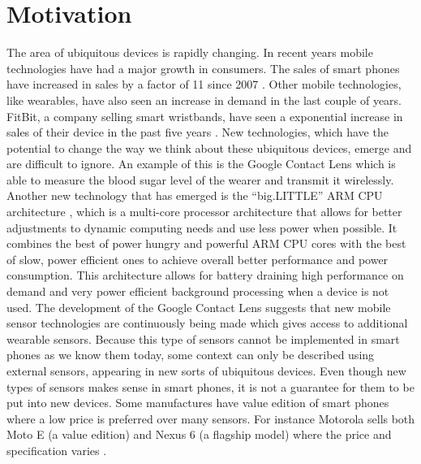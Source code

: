 
\section{Motivation}
\label{sec:motivation}
The area of ubiquitous devices is rapidly changing. In recent years mobile technologies have had a major growth in consumers. The sales of smart phones have increased in sales by a factor of 11 since 2007 \parencite{statsia_smartphones}. Other mobile technologies, like wearables, have also seen an increase in demand in the last couple of years. FitBit, a company selling smart wristbands, have seen a exponential increase in sales of their device in the past five years \parencite{statsia_fitbit}. New technologies, which have the potential to change the way we think about these ubiquitous devices, emerge and are difficult to ignore. An example of this is the Google Contact Lens \parencite{google_contact_lens} which is able to measure the blood sugar level of the wearer and transmit it wirelessly. Another new technology that has emerged is the ``big.LITTLE'' ARM CPU architecture \parencite{big_little_architecture}, which is a multi-core processor architecture that allows for better adjustments to dynamic computing needs and use less power when possible. It combines the best of power hungry and powerful ARM CPU cores with the best of slow, power efficient ones to achieve overall better performance and power consumption. This architecture allows for battery draining high performance on demand and very power efficient background processing when a device is not used. The development of the Google Contact Lens suggests that new mobile sensor technologies are continuously being made which gives access to additional wearable sensors. Because this type of sensors cannot be implemented in smart phones as we know them today, some context can only be described using external sensors, appearing in new sorts of ubiquitous devices. Even though new types of sensors makes sense in smart phones, it is not a guarantee for them to be put into new devices. Some manufactures have value edition of smart phones where a low price is preferred over many sensors. For instance Motorola sells both Moto E (a value edition) and Nexus 6 (a flagship model) where the price and specification varies \parencite{compare_moto_e_nexus_6}.
\\\\

